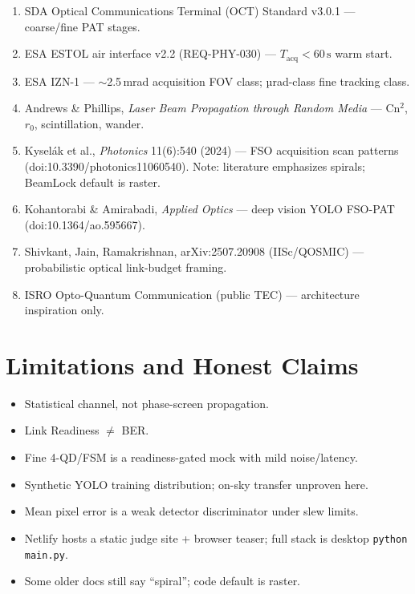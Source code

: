 \documentclass[11pt,a4paper]{article}
\begin{document}
\begin{enumerate}[leftmargin=1.4em]
  \item SDA Optical Communications Terminal (OCT) Standard v3.0.1 --- coarse/fine PAT stages.
  \item ESA ESTOL air interface v2.2 (REQ-PHY-030) --- $T_{\mathrm{acq}}<60\,\mathrm{s}$ warm start.
  \item ESA IZN-1 --- $\sim$2.5\,mrad acquisition FOV class; µrad-class fine tracking class.
  \item Andrews \& Phillips, \emph{Laser Beam Propagation through Random Media} --- Cn$^2$, $r_0$, scintillation, wander.
  \item Kysel\'{a}k et al., \emph{Photonics} 11(6):540 (2024) --- FSO acquisition scan patterns (doi:10.3390/photonics11060540). Note: literature emphasizes spirals; BeamLock default is raster.
  \item Kohantorabi \& Amirabadi, \emph{Applied Optics} --- deep vision YOLO FSO-PAT (doi:10.1364/ao.595667).
  \item Shivkant, Jain, Ramakrishnan, arXiv:2507.20908 (IISc/QOSMIC) --- probabilistic optical link-budget framing.
  \item ISRO Opto-Quantum Communication (public TEC) --- architecture inspiration only.
\end{enumerate}

\section{Limitations and Honest Claims}

\begin{itemize}[leftmargin=1.4em]
  \item Statistical channel, not phase-screen propagation.
  \item Link Readiness $\neq$ BER.
  \item Fine 4-QD/FSM is a readiness-gated mock with mild noise/latency.
  \item Synthetic YOLO training distribution; on-sky transfer unproven here.
  \item Mean pixel error is a weak detector discriminator under slew limits.
  \item Netlify hosts a static judge site + browser teaser; full stack is desktop \texttt{python main.py}.
  \item Some older docs still say ``spiral''; code default is raster.
\end{itemize}
\end{document}
